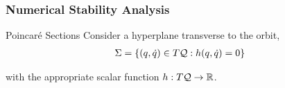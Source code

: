 \begin{frame}
  \frametitle{Numerical Stability Analysis}
  \begin{block}{Poincar\'e Sections}
    Consider a hyperplane transverse to the orbit,
    \begin{align*}
      \Sigma = \left\{ (q, {\dot q}) \in T\mathcal{Q} : h(q, \dot q) = 0\right\}
    \end{align*}
  \end{block}
  with the appropriate scalar function $h : T\mathcal{Q} \to \mathbb{R}$.
\end{frame}
